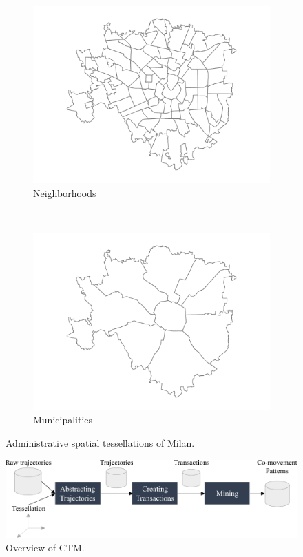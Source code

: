 \documentclass[
]{ceurart}
\begin{document}
\begin{figure}[t]
    \begin{subfigure}[t]{.49\columnwidth}
        \centering
        \includegraphics[width=.8\textwidth]{milan-nil.pdf} %
        \caption{Neighborhoods}
        \label{fig:milnil}
    \end{subfigure}~
    \begin{subfigure}[t]{.49\columnwidth}
        \centering
        \includegraphics[width=.8\textwidth]{milan-munic.pdf} %
        \caption{Municipalities}
        \label{fig:milmun}
    \end{subfigure}
    \caption{Administrative spatial tessellations of Milan.}
    \label{fig:multilevtess}
\end{figure}

\begin{figure}[t]
    \centering
    \includegraphics[scale=.7]{overview.pdf}
    \caption{Overview of CTM.}
    \label{fig:overview}
\end{figure}
\end{document}
